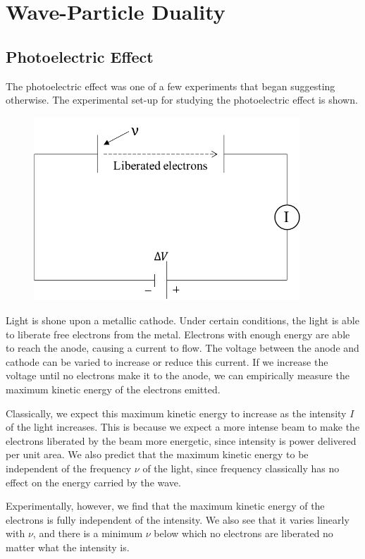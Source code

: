 \section{Wave-Particle Duality}
\subsection{Photoelectric Effect}
The photoelectric effect was one of a few experiments that began suggesting otherwise. The experimental set-up for studying the photoelectric effect is shown. 
\begin{figure}[ht]
\centering
\includegraphics[width=100mm]{images/quantum/photoelectric.pdf}
\end{figure}

Light is shone upon a metallic cathode. Under certain conditions, the light is able to liberate free electrons from the metal. Electrons with enough energy are able to reach the anode, causing a current to flow. The voltage between the anode and cathode can be varied to increase or reduce this current. If we increase the voltage until no electrons make it to the anode, we can empirically measure the maximum kinetic energy of the electrons emitted.

Classically, we expect this maximum kinetic energy to increase as the intensity $I$ of the light increases. This is because we expect a more intense beam to make the electrons liberated by the beam more energetic, since intensity is power delivered per unit area. We also predict that the maximum kinetic energy to be independent of the frequency $\nu$ of the light, since frequency classically has no effect on the energy carried by the wave.

Experimentally, however, we find that the maximum kinetic energy of the electrons is fully independent of the intensity. We also see that it varies linearly with $\nu$, and there is a minimum $\nu$ below which no electrons are liberated no matter what the intensity is.

